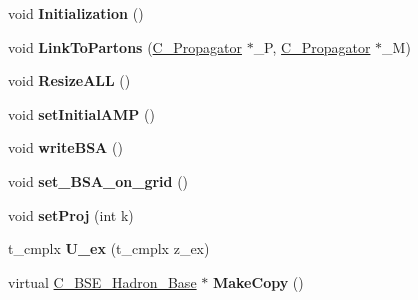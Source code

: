 \begin{DoxyCompactItemize}
\item 
\hypertarget{class_c___b_s_e___hadron___base_a6e6dd94da7097c2efe0ec089ffc086d9}{void {\bfseries Initialization} ()}\label{class_c___b_s_e___hadron___base_a6e6dd94da7097c2efe0ec089ffc086d9}

\item 
\hypertarget{class_c___b_s_e___hadron___base_aebc51176fb8c6eb0392c39b7836a9710}{void {\bfseries Link\-To\-Partons} (\hyperlink{class_c___propagator}{C\-\_\-\-Propagator} $\ast$\-\_\-\-P, \hyperlink{class_c___propagator}{C\-\_\-\-Propagator} $\ast$\-\_\-\-M)}\label{class_c___b_s_e___hadron___base_aebc51176fb8c6eb0392c39b7836a9710}

\item 
\hypertarget{class_c___b_s_e___hadron___base_ad179ea03027bdfa7a9a16a5b5ad00882}{void {\bfseries Resize\-A\-L\-L} ()}\label{class_c___b_s_e___hadron___base_ad179ea03027bdfa7a9a16a5b5ad00882}

\item 
\hypertarget{class_c___b_s_e___hadron___base_a9f8c524af7af498971e321fcb828b8fc}{void {\bfseries set\-Initial\-A\-M\-P} ()}\label{class_c___b_s_e___hadron___base_a9f8c524af7af498971e321fcb828b8fc}

\item 
\hypertarget{class_c___b_s_e___hadron___base_ab10ef56f90f427cfabcc1597a75c6499}{void {\bfseries write\-B\-S\-A} ()}\label{class_c___b_s_e___hadron___base_ab10ef56f90f427cfabcc1597a75c6499}

\item 
\hypertarget{class_c___b_s_e___hadron___base_a8ce8080fc091a89bf1d81ad79ab6f60a}{void {\bfseries set\-\_\-\-B\-S\-A\-\_\-on\-\_\-grid} ()}\label{class_c___b_s_e___hadron___base_a8ce8080fc091a89bf1d81ad79ab6f60a}

\item 
\hypertarget{class_c___b_s_e___hadron___base_af0c90098726e090d8d3a9a86947e50da}{void {\bfseries set\-Proj} (int k)}\label{class_c___b_s_e___hadron___base_af0c90098726e090d8d3a9a86947e50da}

\item 
\hypertarget{class_c___b_s_e___hadron___base_a905aff050ef47b1b75d067f79ff59686}{t\-\_\-cmplx {\bfseries U\-\_\-ex} (t\-\_\-cmplx z\-\_\-ex)}\label{class_c___b_s_e___hadron___base_a905aff050ef47b1b75d067f79ff59686}

\item 
\hypertarget{class_c___b_s_e___hadron___base_ab6556ff1d9c33c99a40b285148705bdd}{virtual \hyperlink{class_c___b_s_e___hadron___base}{C\-\_\-\-B\-S\-E\-\_\-\-Hadron\-\_\-\-Base} $\ast$ {\bfseries Make\-Copy} ()}\label{class_c___b_s_e___hadron___base_ab6556ff1d9c33c99a40b285148705bdd}


\end{DoxyCompactItemize}
